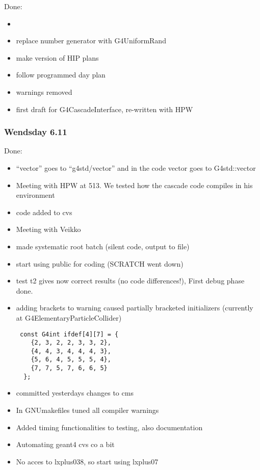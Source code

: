 Done:
\begin{itemize}
\item
\item replace number generator with G4UniformRand
\item make version of HIP plans
\item follow programmed day plan
\item warnings removed
\item first draft for G4CascadeInterface, re-written with HPW
\end{itemize}

\subsubsection{Wendsday 6.11}

Done:
\begin{itemize}
\item ``vector'' goes to ``g4std/vector'' and in the code vector goes
  to G4std::vector
\item Meeting with HPW at 513. We tested how the cascade code compiles
  in his environment
\item code added to cvs
\item Meeting with Veikko
\item made systematic root batch (silent code, output to file)
\item start using public for coding (SCRATCH went down)
\item test t2 gives now correct results (no code differences!), First
  debug phase done.
\item adding brackets to warning caused partially bracketed
  initializers (currently at G4ElementaryParticleCollider)

\begin{verbatim}
 const G4int ifdef[4][7] = {
    {2, 3, 2, 2, 3, 3, 2}, 
    {4, 4, 3, 4, 4, 4, 3}, 
    {5, 6, 4, 5, 5, 5, 4},
    {7, 7, 5, 7, 6, 6, 5}
  };
\end{verbatim}
  
\item committed yesterdays changes to cms
\item In GNUmakefiles tuned all compiler warnings
\item Added timing functionalities to testing, also documentation
\item Automating geant4 cvs co a bit
\item No acces to lxplus038, so start using lxplus07

\end{itemize}

